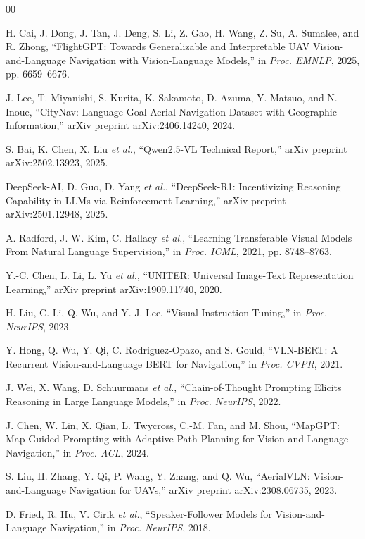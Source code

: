 \documentclass[conference]{IEEEtran}
\begin{document}
\begin{thebibliography}{00}

H. Cai, J. Dong, J. Tan, J. Deng, S. Li, Z. Gao, H. Wang, Z. Su, A. Sumalee, and R. Zhong, ``FlightGPT: Towards Generalizable and Interpretable UAV Vision-and-Language Navigation with Vision-Language Models,'' in \textit{Proc. EMNLP}, 2025, pp. 6659--6676.

J. Lee, T. Miyanishi, S. Kurita, K. Sakamoto, D. Azuma, Y. Matsuo, and N. Inoue, ``CityNav: Language-Goal Aerial Navigation Dataset with Geographic Information,'' arXiv preprint arXiv:2406.14240, 2024.

S. Bai, K. Chen, X. Liu \textit{et al.}, ``Qwen2.5-VL Technical Report,'' arXiv preprint arXiv:2502.13923, 2025.

DeepSeek-AI, D. Guo, D. Yang \textit{et al.}, ``DeepSeek-R1: Incentivizing Reasoning Capability in LLMs via Reinforcement Learning,'' arXiv preprint arXiv:2501.12948, 2025.

A. Radford, J. W. Kim, C. Hallacy \textit{et al.}, ``Learning Transferable Visual Models From Natural Language Supervision,'' in \textit{Proc. ICML}, 2021, pp. 8748--8763.

Y.-C. Chen, L. Li, L. Yu \textit{et al.}, ``UNITER: Universal Image-Text Representation Learning,'' arXiv preprint arXiv:1909.11740, 2020.

H. Liu, C. Li, Q. Wu, and Y. J. Lee, ``Visual Instruction Tuning,'' in \textit{Proc. NeurIPS}, 2023.

Y. Hong, Q. Wu, Y. Qi, C. Rodriguez-Opazo, and S. Gould, ``VLN-BERT: A Recurrent Vision-and-Language BERT for Navigation,'' in \textit{Proc. CVPR}, 2021.

J. Wei, X. Wang, D. Schuurmans \textit{et al.}, ``Chain-of-Thought Prompting Elicits Reasoning in Large Language Models,'' in \textit{Proc. NeurIPS}, 2022.

J. Chen, W. Lin, X. Qian, L. Twycross, C.-M. Fan, and M. Shou, ``MapGPT: Map-Guided Prompting with Adaptive Path Planning for Vision-and-Language Navigation,'' in \textit{Proc. ACL}, 2024.

S. Liu, H. Zhang, Y. Qi, P. Wang, Y. Zhang, and Q. Wu, ``AerialVLN: Vision-and-Language Navigation for UAVs,'' arXiv preprint arXiv:2308.06735, 2023.

D. Fried, R. Hu, V. Cirik \textit{et al.}, ``Speaker-Follower Models for Vision-and-Language Navigation,'' in \textit{Proc. NeurIPS}, 2018.


\end{thebibliography}
\end{document}
